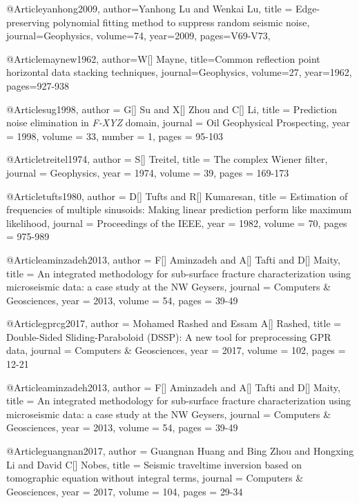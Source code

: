 @Article{yanhong2009,
  author={Yanhong Lu and Wenkai Lu},
  title ={ Edge-preserving polynomial fitting method to suppress random seismic noise},
  journal={Geophysics},
  volume=74,
  year=2009,
  pages={V69-V73},
}

@Article{maynew1962,
author={W[] Mayne},
title={Common reflection point horizontal data stacking techniques},
journal={Geophysics},
volume=27,
year=1962,
pages={927-938}
}

@Article{sug1998,
  author = 	 {G[] Su and X[] Zhou and C[] Li},
  title = 	 { Prediction noise elimination in \emph{F-XYZ} domain},
  journal = 	 { Oil Geophysical Prospecting},
  year = 	 1998,
  volume = 	 33,
  number = 	 1,
  pages = 	 {95-103}}

@Article{treitel1974,
  author = 	 {S[] Treitel},
  title = 	 {The complex Wiener filter},
  journal = 	 { Geophysics},
  year = 	 1974,
  volume = 	 39,
  pages = 	 {169-173}}

@Article{tufts1980,
  author = 	 {D[] Tufts and R[] Kumaresan},
  title = 	 {Estimation of frequencies of multiple sinusoids: Making linear prediction perform like maximum likelihood},
  journal = 	 { Proceedings of the IEEE},
  year = 	 1982,
  volume = 	 70,
  pages = 	 {975-989}}

@Article{aminzadeh2013,
  author = 	 {F[] Aminzadeh and A[] Tafti and D[] Maity},
  title = 	 {An integrated methodology for sub-surface fracture characterization using microseismic data: a case study at the NW {G}eysers},
  journal = 	 { Computers \& Geosciences},
  year = 	 2013,
  volume = 	 54,
  pages = 	 {39-49}}

@Article{gprcg2017,
  author = 	 {Mohamed Rashed and Essam A[] Rashed},
  title = 	 {Double-Sided Sliding-Paraboloid (DSSP): A new tool for preprocessing GPR data},
  journal = 	 { Computers \& Geosciences},
  year = 	 2017,
  volume = 	 102,
  pages = 	 {12-21}}
  
@Article{aminzadeh2013,
  author = 	 {F[] Aminzadeh and A[] Tafti and D[] Maity},
  title = 	 {An integrated methodology for sub-surface fracture characterization using microseismic data: a case study at the NW {G}eysers},
  journal = 	 { Computers \& Geosciences},
  year = 	 2013,
  volume = 	 54,
  pages = 	 {39-49}}
  
 @Article{guangnan2017,
  author = 	 {Guangnan Huang and Bing Zhou and Hongxing Li and David C[] Nobes},
  title = 	 {Seismic traveltime inversion based on tomographic equation without integral terms},
  journal = 	 { Computers \& Geosciences},
  year = 	 2017,
  volume = 	 104,
  pages = 	 {29-34}} 

